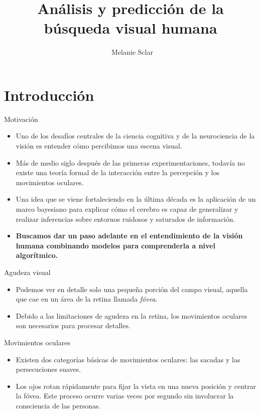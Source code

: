 \documentclass[compress]{beamer}
\title[Defensa de tesis de licenciatura] %
{Análisis y predicción de la búsqueda visual humana}
\author[Melanie Sclar] %
{~Melanie Sclar}
\institute[UBA] %
{
  Facultad de Ciencias Exactas y Naturales\\
  Universidad de Buenos Aires
}
\begin{document}
\begin{frame}
  \titlepage
\end{frame}


\section{Introducción}
\begin{frame}{Motivación}
\begin{itemize}
\item Uno de los desafíos centrales de la ciencia cognitiva y de la neurociencia de la visión es entender cómo percibimos una escena visual.
\item Más de medio siglo después de las primeras experimentaciones, todavía no existe una teoría formal de la interacción entre la percepción y los movimientos oculares.
\item Una idea que se viene fortaleciendo en la última década es la aplicación de un marco bayesiano para explicar cómo el cerebro es capaz de generalizar y realizar inferencias sobre entornos ruidosos y saturados de información.
\item \textbf{Buscamos dar un paso adelante en el entendimiento de la visión humana combinando modelos para comprenderla a nivel algorítmico.}
\end{itemize}
\end{frame}

\begin{frame}{Agudeza visual}
\begin{itemize}
\item Podemos ver en detalle solo una pequeña porción del campo visual, aquella que cae en un área de la retina llamada \textit{fóvea}.
\item Debido a las limitaciones de agudeza en la retina, los movimientos oculares son necesarios para procesar detalles.
\end{itemize}
\end{frame}

\begin{frame}{Movimientos oculares}
\begin{itemize}
\item Existen dos categorías básicas de movimientos oculares: las sacadas y las persecuciones suaves.
\item Los ojos rotan rápidamente para fijar la vista en una nueva posición y centrar la fóvea. Este proceso ocurre varias veces por segundo sin involucrar la consciencia de las personas.
\end{itemize}
\end{frame}
\end{document}
